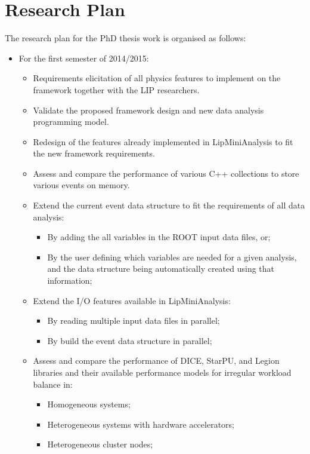 \chapter{Research Plan}
\label{thesis_planning}

The research plan for the PhD thesis work is organised as follows:

\begin{itemize}
	\item For the first semester of 2014/2015:
	\begin{itemize}
		\item Requirements elicitation of all physics features to implement on the framework together with the LIP researchers.
		\item Validate the proposed framework design and new data analysis programming model.
		\item Redesign of the features already implemented in LipMiniAnalysis to fit the new framework requirements.
		\item Assess and compare the performance of various C++ collections to store various events on memory.
		\item Extend the current event data structure to fit the requirements of all data analysis:
		\begin{itemize}
			\item By adding the all variables in the ROOT input data files, or;
			\item By the user defining which variables are needed for a given analysis, and the data structure being automatically created using that information;
		\end{itemize}
		\item Extend the I/O features available in LipMiniAnalysis:
		\begin{itemize}
			\item By reading multiple input data files in parallel;
			\item By build the event data structure in parallel;
		\end{itemize}
		\item Assess and compare the performance of DICE, StarPU, and Legion libraries and their available performance models for irregular workload balance in:
		\begin{itemize}
			\item Homogeneous systems;
			\item Heterogeneous systems with hardware accelerators;
			\item Heterogeneous cluster nodes;

\end{itemize}
\end{itemize}
\end{itemize}

